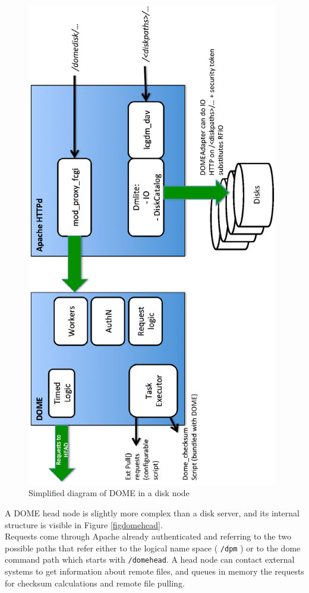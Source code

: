 \documentclass[a4paper]{jpconf}
\begin{document}
\begin{figure}
\begin{center}
 \includegraphics[width=11cm,keepaspectratio=true,angle=-90,origin=c]{./pics/domepics_disk.eps}
 \caption{Simplified diagram of DOME in a disk node}
 \label{figdomedisk}
\end{center}
\end{figure}

A DOME head node is slightly more complex than a disk server, and its internal structure is
visible in Figure \ref{figdomehead}.\\
Requests come through Apache already authenticated and referring to the two possible paths that
refer either to the logical name space ( \lstinline{/dpm} ) or to the dome command path which starts with \lstinline{/domehead}.
A head node can contact external systems to get information about remote files, and queues in memory the requests for checksum calculations and remote file pulling.\\
\end{document}
